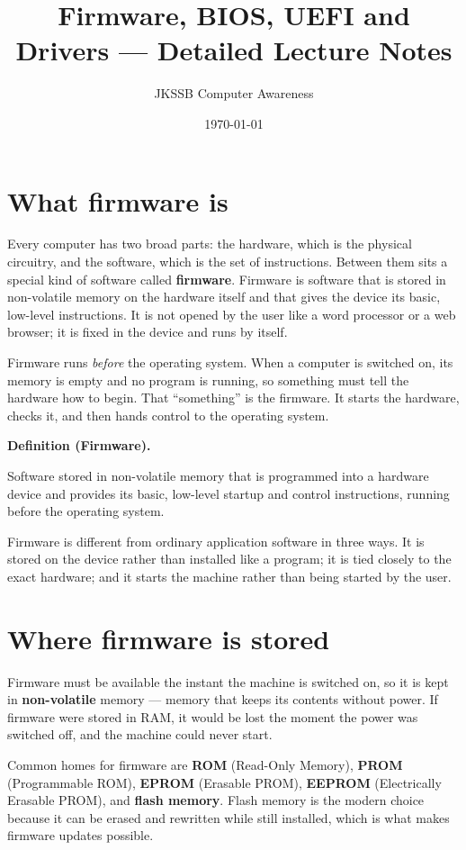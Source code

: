 \documentclass[11pt]{article}
\title{Firmware, BIOS, UEFI and Drivers --- Detailed Lecture Notes}
\author{JKSSB Computer Awareness}
\date{\today}
\newenvironment{definitionbox}[1]{%
  \par\noindent\textbf{Definition (#1).}\ \itshape
}{\par\vspace{0.3em}}
\begin{document}
\maketitle

\section{What firmware is}
Every computer has two broad parts: the hardware, which is the physical
circuitry, and the software, which is the set of instructions. Between them
sits a special kind of software called \textbf{firmware}. Firmware is
software that is stored in non-volatile memory on the hardware itself and
that gives the device its basic, low-level instructions. It is not opened by
the user like a word processor or a web browser; it is fixed in the device
and runs by itself.

Firmware runs \emph{before} the operating system. When a computer is switched
on, its memory is empty and no program is running, so something must tell the
hardware how to begin. That ``something'' is the firmware. It starts the
hardware, checks it, and then hands control to the operating system.

\begin{definitionbox}{Firmware}
Software stored in non-volatile memory that is programmed into a hardware
device and provides its basic, low-level startup and control instructions,
running before the operating system.
\end{definitionbox}

Firmware is different from ordinary application software in three ways. It is
stored on the device rather than installed like a program; it is tied closely
to the exact hardware; and it starts the machine rather than being started by
the user.

\section{Where firmware is stored}
Firmware must be available the instant the machine is switched on, so it is
kept in \textbf{non-volatile} memory --- memory that keeps its contents
without power. If firmware were stored in RAM, it would be lost the moment
the power was switched off, and the machine could never start.

Common homes for firmware are \textbf{ROM} (Read-Only Memory), \textbf{PROM}
(Programmable ROM), \textbf{EPROM} (Erasable PROM), \textbf{EEPROM}
(Electrically Erasable PROM), and \textbf{flash memory}. Flash memory is the
modern choice because it can be erased and rewritten while still installed,
which is what makes firmware updates possible.
\end{document}
